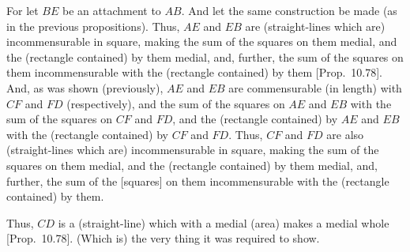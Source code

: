 \begin{Parallel}{}{}
{For let $BE$ be an attachment to $AB$. And let the same
construction be made (as in the previous propositions). Thus,
$AE$ and $EB$ are (straight-lines which are) incommensurable in square, making
the sum of the squares on them medial, and the (rectangle contained)
by them medial, and, further, the sum of the squares on them incommensurable with the (rectangle contained) by them [Prop.~10.78].  And, as was shown (previously),
$AE$ and $EB$ are commensurable (in length) with $CF$ and $FD$ (respectively),
and the sum of the squares on $AE$ and $EB$ with the sum of the squares on
$CF$ and $FD$, and the (rectangle contained) by $AE$ and $EB$ with
the (rectangle contained) by $CF$ and $FD$. Thus, $CF$ and
$FD$ are also (straight-lines which are) incommensurable in square, making the sum of the squares on
them medial, and the (rectangle contained) by them medial, and, further,
the sum of the [squares] on them incommensurable with the (rectangle
contained) by them.

Thus, $CD$ is a (straight-line) which with a medial (area) makes a medial
whole [Prop.~10.78]. (Which is) the very thing
it was required to show.}
\end{Parallel}

